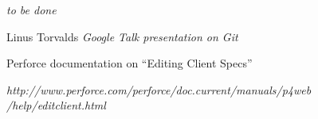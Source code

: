 \documentclass[%
	final,
	notitlepage,
	narroweqnarray,
	inline,
	twoside,
	]{ieee}
\newcommand{\latexiie}{\LaTeX2{\Large$_\varepsilon$}}
\begin{document}
\emph{to be done}



\begin{thebibliography}{1}

% 

Linus Torvalds
\newblock \emph{Google Talk presentation on Git}

Perforce documentation on ``Editing Client Specs''

\newblock \emph{
http://www.perforce.com/perforce/doc.current/manuals/p4web
/help/editclient.html
}

\end{thebibliography}

\end{document}
